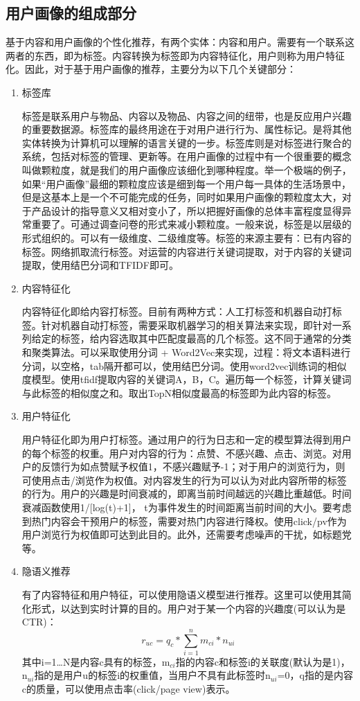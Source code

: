 		\subsection{用户画像的组成部分}
		基于内容和用户画像的个性化推荐，有两个实体：内容和用户。需要有一个联系这两者的东西，即为标签。内容转换为标签即为内容特征化，用户则称为用户特征化。因此，对于基于用户画像的推荐，主要分为以下几个关键部分：
		\begin{enumerate}[(1)]
		\item 标签库

		标签是联系用户与物品、内容以及物品、内容之间的纽带，也是反应用户兴趣的重要数据源。标签库的最终用途在于对用户进行行为、属性标记。是将其他实体转换为计算机可以理解的语言关键的一步。标签库则是对标签进行聚合的系统，包括对标签的管理、更新等。在用户画像的过程中有一个很重要的概念叫做颗粒度，就是我们的用户画像应该细化到哪种程度。举一个极端的例子，如果“用户画像”最细的颗粒度应该是细到每一个用户每一具体的生活场景中，但是这基本上是一个不可能完成的任务，同时如果用户画像的颗粒度太大，对于产品设计的指导意义又相对变小了，所以把握好画像的总体丰富程度显得异常重要了。可通过调查问卷的形式来减小颗粒度。一般来说，标签是以层级的形式组织的。可以有一级维度、二级维度等。标签的来源主要有：已有内容的标签。网络抓取流行标签。对运营的内容进行关键词提取，对于内容的关键词提取，使用结巴分词和TFIDF即可。
		\item 内容特征化

		内容特征化即给内容打标签。目前有两种方式：人工打标签和机器自动打标签。针对机器自动打标签，需要采取机器学习的相关算法来实现，即针对一系列给定的标签，给内容选取其中匹配度最高的几个标签。这不同于通常的分类和聚类算法。可以采取使用分词 + Word2Vec来实现，过程：将文本语料进行分词，以空格，tab隔开都可以，使用结巴分词。使用word2vec训练词的相似度模型。使用tfidf提取内容的关键词A，B，C。遍历每一个标签，计算关键词与此标签的相似度之和。取出TopN相似度最高的标签即为此内容的标签。
		\item 用户特征化

		用户特征化即为用户打标签。通过用户的行为日志和一定的模型算法得到用户的每个标签的权重。用户对内容的行为：点赞、不感兴趣、点击、浏览。对用户的反馈行为如点赞赋予权值1，不感兴趣赋予-1；对于用户的浏览行为，则可使用点击/浏览作为权值。对内容发生的行为可以认为对此内容所带的标签的行为。用户的兴趣是时间衰减的，即离当前时间越远的兴趣比重越低。时间衰减函数使用1/[log(t)+1]， t为事件发生的时间距离当前时间的大小。要考虑到热门内容会干预用户的标签，需要对热门内容进行降权。使用click/pv作为用户浏览行为权值即可达到此目的。此外，还需要考虑噪声的干扰，如标题党等。
		\item 隐语义推荐

		有了内容特征和用户特征，可以使用隐语义模型进行推荐。这里可以使用其简化形式，以达到实时计算的目的。用户对于某一个内容的兴趣度(可以认为是CTR)：
	    \begin{equation}
	    r_{uc}=q_c \ast \sum_{i=1}^{n} m_{ci} \ast n_{ui}
	    \label{CTR}
	    \end{equation}
	    其中i=1…N是内容c具有的标签，m$_{ci}$指的内容c和标签i的关联度(默认为是1)，n$_{ui}$指的是用户u的标签i的权重值，当用户不具有此标签时n$_{ui}$=0，q指的是内容c的质量，可以使用点击率(click/page view)表示。

		\end{enumerate}
